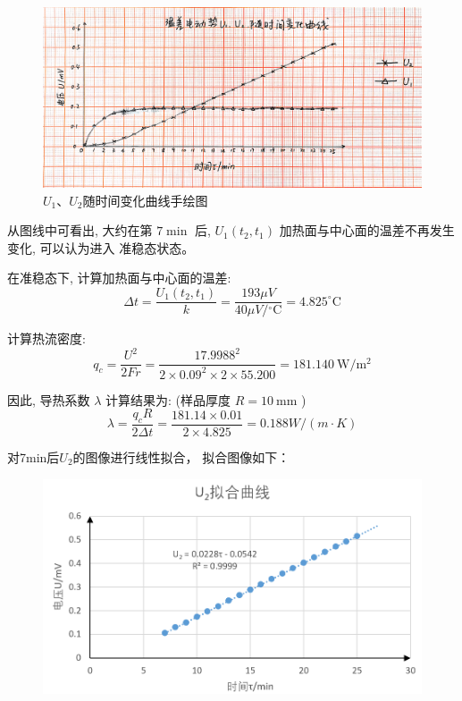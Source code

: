 \documentclass[UTF8]{ctexart}
\begin{document}
\begin{figure}[H]
    \centering
    \includegraphics[scale=0.09]{手绘波形.jpg}
    \caption{$U_1$、$U_2$随时间变化曲线手绘图}
    \label{fig:label}
\end{figure}



从图线中可看出, 大约在第 $ 7 \min $ 后, $ U_{1}\left(t_{2}, t_{1}\right)$  加热面与中心面的温差不再发生变化, 可以认为进入 准稳态状态。

在准稳态下, 计算加热面与中心面的温差:
$$
\Delta t=\frac{U_{1}\left(t_{2} ,t_{1}\right)}{k}=\frac{193 \mu V}{40 \mu V /{ }^{\circ} \mathrm{C}}=4.825^{\circ} \mathrm{C}
$$

计算热流密度:
$$
q_{c}=\frac{U^{2}}{2 F r}=\frac{17.9988^{2}}{2 \times 0.09^{2} \times 2\times 55.200 }=181.140 \mathrm{~W} / \mathrm{m}^{2}
$$

因此, 导热系数 $ \lambda$  计算结果为: (样品厚度  $R=10 \mathrm{~mm} $ )
$$
\lambda=\frac{q_{c} R}{2 \Delta t}=\frac{181.14\times 0.01}{2\times 4.825}=0.188 W /(m \cdot K)
$$


对7min后$U_2$的图像进行线性拟合，
拟合图像如下：

\begin{figure}[H]
    \centering
    \includegraphics[scale=0.8]{拟合曲线.png}
\end{figure}
\end{document}
